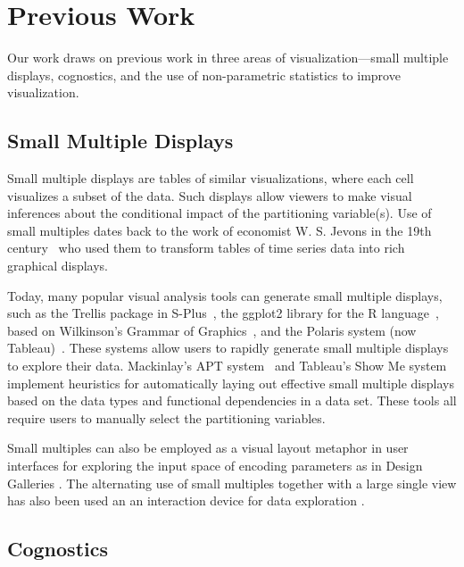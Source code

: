 \section{Previous Work}
\label{sec:related}
Our work draws on previous work in three areas of visualization---small multiple displays, cognostics, and the use of non-parametric statistics to improve visualization.

\subsection{Small Multiple Displays}
Small multiple displays are tables of similar visualizations, where each cell visualizes a subset of the data. Such displays allow viewers to make visual inferences about the conditional impact of the partitioning variable(s). Use of small multiples dates back to the work of economist W. S. Jevons in the 19th century~\cite{Kelley1973} who used them to transform tables of time series data into rich graphical displays. 

Today, many popular visual analysis tools can generate small multiple displays, such as the Trellis package in S-Plus~\cite{Becker1996-manual}, the ggplot2 library for the R language~\cite{Wickham2006}, based on Wilkinson's Grammar of Graphics~\cite{Wilkinson2005}, and the Polaris system (now Tableau)~\cite{Stolte2002}. These systems allow users to rapidly generate small multiple displays to explore their data.
Mackinlay's APT system~\cite{mackinlay1986} and Tableau's Show Me system~\cite{mackinlay2007} implement heuristics for automatically laying out effective small multiple displays based on the data types and functional dependencies in a data set.
These tools all require users to manually select the partitioning variables.


Small multiples can also be employed as a visual layout metaphor in user interfaces for exploring the input space of encoding parameters as in Design Galleries \cite{marks1997}. The alternating use of small multiples together with a large single view has also been used an an interaction device for data exploration \cite{van2013}.

\subsection{Cognostics}

